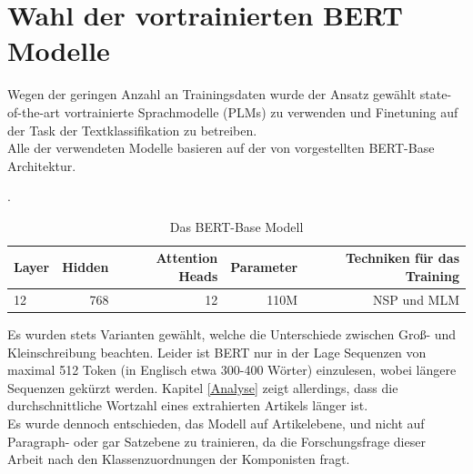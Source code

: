 \documentclass[ngerman]{ttlab-qualify}
\begin{document}
\section{Wahl der vortrainierten BERT Modelle} \label{BERT_Modelle}
Wegen der geringen Anzahl an Trainingsdaten wurde der Ansatz gewählt state-of-the-art vortrainierte Sprachmodelle (PLMs) zu verwenden und Finetuning auf der Task der Textklassifikation zu betreiben.\\
Alle der verwendeten Modelle basieren auf der von \textcite{devlin-etal-2019-bert} vorgestellten BERT-Base Architektur. 
\begin{table}[H]
    \centering
    \caption{Das BERT-Base Modell}.
    \begin{tabular}[h]{lrrrr}
    \toprule
    Layer &  Hidden & Attention Heads & Parameter & Techniken für das Training\\ 
    \midrule
    12 & 768 & 12  & 110M & NSP und MLM\\
    \bottomrule
    \end{tabular} 
    \label{BERT_BASE}
\end{table} 
\noindent Es wurden stets Varianten gewählt, welche die Unterschiede zwischen Groß- und Kleinschreibung beachten. Leider ist BERT nur in der Lage Sequenzen von maximal 512 Token (in Englisch etwa 300-400 Wörter) einzulesen, wobei längere Sequenzen gekürzt werden. Kapitel \ref{Analyse} zeigt allerdings, dass die durchschnittliche Wortzahl eines extrahierten Artikels länger ist.\\
Es wurde dennoch entschieden, das Modell auf Artikelebene, und nicht auf Paragraph- oder gar Satzebene zu trainieren, da die Forschungsfrage dieser Arbeit nach den Klassenzuordnungen der Komponisten fragt.
\end{document}

